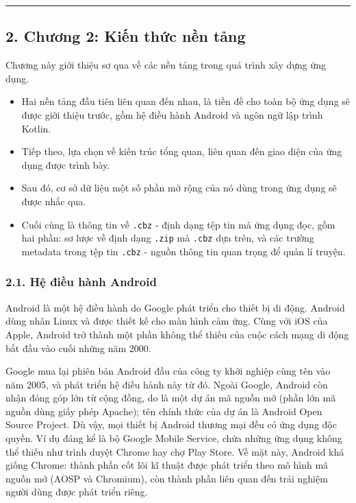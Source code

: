 \begin{center}\rule{0.5\linewidth}{0.5pt}\end{center}

\hypertarget{chux1b0ux1a1ng-2-kiux1ebfn-thux1ee9c-nux1ec1n-tux1ea3ng}{%
  \subsection{\texorpdfstring{2. Chương 2: Kiến thức nền tảng
    }{2. Chương 2: Kiến thức nền tảng }}\label{chux1b0ux1a1ng-2-kiux1ebfn-thux1ee9c-nux1ec1n-tux1ea3ng}}

Chương này giới thiệu sơ qua về các nền tảng trong quá trình xây dựng
ứng dụng.

\begin{itemize}
  
  \item
        Hai nền tảng đầu tiên liên quan đến nhau, là tiền đề cho toàn bộ ứng
        dụng sẽ được giới thiệu trước, gồm hệ điều hành Android và ngôn ngữ
        lập trình Kotlin.
  \item
        Tiếp theo, lựa chọn về kiến trúc tổng quan, liên quan đến giao diện
        của ứng dụng được trình bày.
  \item
        Sau đó, cơ sở dữ liệu một số phần mở rộng của nó dùng trong ứng dụng
        sẽ được nhắc qua.
  \item
        Cuối cùng là thông tin về \texttt{.cbz} - định dạng tệp tin mà ứng
        dụng đọc, gồm hai phần: sơ lược về định dạng \texttt{.zip} mà
        \texttt{.cbz} dựa trên, và các trường metadata trong tệp tin
        \texttt{.cbz} - nguồn thông tin quan trọng để quản lí truyện.
\end{itemize}

\hypertarget{hux1ec7-ux111iux1ec1u-huxe0nh-android}{%
  \subsubsection{\texorpdfstring{2.1. Hệ điều hành Android
    }{2.1. Hệ điều hành Android }}\label{hux1ec7-ux111iux1ec1u-huxe0nh-android}}

Android là một hệ điều hành do Google phát triển cho thiết bị di động.
Android dùng nhân Linux và được thiết kế cho màn hình cảm ứng. Cùng với
iOS của Apple, Android trở thành một phần không thể thiếu của cuộc cách
mạng di động bắt đầu vào cuối những năm 2000.

Google mua lại phiên bản Android đầu của công ty khởi nghiệp cùng tên
vào năm 2005, và phát triển hệ điều hành này từ đó. Ngoài Google,
Android còn nhận đóng góp lớn từ cộng đồng, do là một dự án mã nguồn mở
(phần lớn mã nguồn dùng giấy phép Apache); tên chính thức của dự án là
Android Open Source Project. Dù vậy, mọi thiết bị Android thương mại đều
có ứng dụng độc quyền. Ví dụ đáng kể là bộ Google Mobile Service, chứa
những ứng dụng không thể thiếu như trình duyệt Chrome hay chợ Play
Store. Về mặt này, Android khá giống Chrome: thành phần cốt lõi kĩ thuật
được phát triển theo mô hình mã nguồn mở (AOSP và Chromium), còn thành
phần liên quan đến trải nghiệm người dùng được phát triển riêng.

